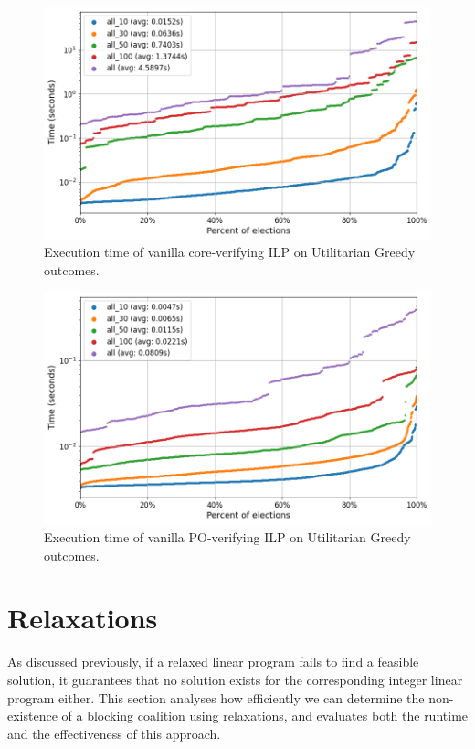\documentclass[magisterska,en]{pracamgr}
\newcommand\chartsize{0.94}
\begin{document}
\begin{figure}[h!]
    \centering
    \includegraphics[width=\chartsize\linewidth]{outputs/NoOptimizations/greedy-core.png}
    \caption{Execution time of vanilla core-verifying ILP on Utilitarian Greedy outcomes.}
    \label{vanilla-greedy-core}
\end{figure}

\begin{figure}[h!]
    \centering
    \includegraphics[width=\chartsize\linewidth]{outputs/NoOptimizations/greedy-po.png}
    \caption{Execution time of vanilla PO-verifying ILP on Utilitarian Greedy outcomes.}
    \label{vanilla-greedy-po}
\end{figure}

\section{Relaxations}

As discussed previously, if a relaxed linear program fails to find a feasible solution, it guarantees that no solution exists for the corresponding integer linear program either. This section analyses how efficiently we can determine the non-existence of a blocking coalition using relaxations, and evaluates both the runtime and the effectiveness of this approach.
\end{document}
